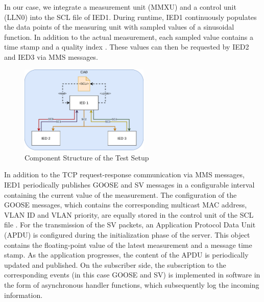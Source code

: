 \documentclass[conference, onecolumn, a4paper]{IEEEtran}
\begin{document}
\smallskip
In our case, we integrate a measurement unit (MMXU) \cite[p. 268]{IEC61850-7-4:2010} and a control unit (LLN0) \cite[p. 164]{IEC61850-7-4:2010} 
into the SCL file of IED1. During runtime, IED1 continuously populates the data points of the measuring unit with sampled values of a sinusoidal function. 
In addition to the actual measurement, each sampled value contains a time stamp and a quality index \cite[p. 61ff]{IEC61850-7-3:2010}. These values can 
then be requested by IED2 and IED3 via MMS messages.

\begin{figure}[h]
    \centering
    \includegraphics[width=0.55\textwidth]{images/TestSetupIEDs.png}
    \caption{Component Structure of the Test Setup}
    \label{image:MACsecTestSetup}
\end{figure}

\noindent In addition to the TCP request-response communication via MMS messages, IED1 periodically publishes GOOSE and SV messages in a configurable 
interval containing the current value of the measurement. The configuration of the GOOSE messages, which contains the corresponding multicast MAC address, 
VLAN ID and VLAN priority, are equally stored in the control unit of the SCL file \cite[p. 189]{IEC61850-8-1:2011}. For the transmission of the SV 
packets, an Application Protocol Data Unit (APDU) is configured during the initialization phase of the server. This object contains the floating-point 
value of the latest measurement and a message time stamp. As the application progresses, the content of the APDU is periodically updated and published. 
On the subscriber side, the subscription to the corresponding events (in this case GOOSE and SV) is implemented in software in the form of asynchronous 
handler functions, which subsequently log the incoming information. 

\end{document}
